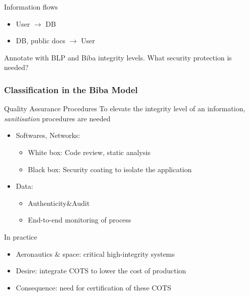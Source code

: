 \begin{reveals}
\begin{frame}
  \begin{block}{Information flows}
    \begin{itemize}
    \item User \(\to\) DB
    \item DB, public docs \(\to\) User
    \end{itemize}
    Annotate with BLP and Biba integrity levels. What security
    protection is needed?
  \end{block}

\end{frame}



\begin{frame}
  \frametitle{Classification in the Biba Model}

  \begin{block} {Quality Assurance Procedures}
    To elevate the integrity level of an information,
    \emph{sanitisation} procedures are needed
    \begin{itemize}
    \item Softwares, Networks:
      \begin{itemize}
      \item White box: Code review, static analysis
      \item Black box: Security coating to isolate the application
      \end{itemize}
    \item Data:
      \begin{itemize}
      \item Authenticity\&Audit
      \item End-to-end monitoring of process
      \end{itemize}
    \end{itemize}
  \end{block}


  \begin{block} {In practice}
    \begin{itemize}
    \item Aeronautics \& space: critical high-integrity systems
    \item Desire: integrate COTS to lower the cost of production
    \item Consequence: need for certification of these COTS
    \end{itemize}
  \end{block}


\end{frame}



\end{reveals}
